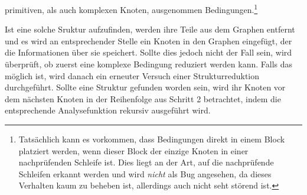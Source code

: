 \documentclass[11pt]{article}
\begin{document}
\begin{enumerate}
\begin{enumerate}
				primitiven, als auch komplexen Knoten, ausgenommen
				Bedingungen.\footnote{
					Tatsächlich kann es vorkommen, dass Bedingungen direkt in
					einem Block platziert werden, wenn dieser Block der einzige
					Knoten in einer nachprüfenden Schleife ist.
					Dies liegt an der Art, auf die nachprüfende Schleifen
					erkannt werden und wird \textit{nicht} als Bug angesehen,
					da dieses Verhalten kaum zu beheben ist, allerdings auch
					nicht seht störend ist.
				}
		\end{enumerate}
		Ist eine solche Sruktur aufzufinden, werden ihre Teile aus dem Graphen entfernt
        und es wird an entsprechender Stelle ein Knoten in den Graphen eingefügt, der
		die Informationen über sie speichert. Sollte dies jedoch nicht der Fall
		sein, wird überprüft, ob zuerst eine komplexe Bedingung reduziert
		werden kann. Falls das möglich ist, wird danach ein erneuter Versuch einer
		Strukturreduktion durchgeführt. Sollte eine Struktur gefunden worden
		sein, wird ihr Knoten vor dem nächsten Knoten in der Reihenfolge aus
		Schritt 2 betrachtet, indem die entsprechende Analysefunktion rekursiv
		ausgeführt wird.
       

\end{enumerate}
\end{document}
